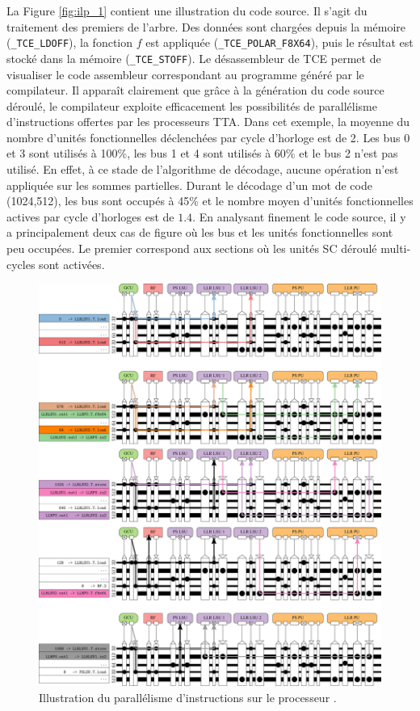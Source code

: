 La Figure \ref{fig:ilp_1} contient une illustration du code source. Il s'agit du traitement des premiers \noeuds de l'arbre. Des données sont chargées depuis la mémoire (\texttt{\_TCE\_LDOFF}), la fonction $f$ est appliquée (\texttt{\_TCE\_POLAR\_F8X64}), puis le résultat est stocké dans la mémoire (\texttt{\_TCE\_STOFF}). Le désassembleur de TCE permet de visualiser le code assembleur correspondant au programme généré par le compilateur. Il apparaît clairement que grâce à la génération du code source déroulé, le compilateur exploite efficacement les possibilités de parallélisme d'instructions offertes par les processeurs TTA. Dans cet exemple, la moyenne du nombre d'unités fonctionnelles déclenchées par cycle d'horloge est de 2. Les bus 0 et 3 sont utilisés à 100\%, les bus 1 et 4 sont utilisés à 60\% et le bus 2 n'est pas utilisé. En effet, à ce stade de l'algorithme de décodage, aucune opération n'est appliquée sur les sommes partielles. Durant le décodage d'un mot de code (1024,512), les bus sont occupés à 45\% et le nombre moyen d'unités fonctionnelles actives par cycle d'horloges est de $1.4$. En analysant finement le code source, il y a principalement deux cas de figure où les bus et les unités fonctionnelles sont peu occupées. Le premier correspond aux sections où les unités \og SC déroulé \fg multi-cycles sont activées. 
\begin{figure}[htp]
\centering
\includegraphics[width=\textwidth]{main/ch4_fig/ilp_2}
\caption{Illustration du parallélisme d'instructions sur le processeur \TTSC.}
\label{fig:ilp_2}
\end{figure}
